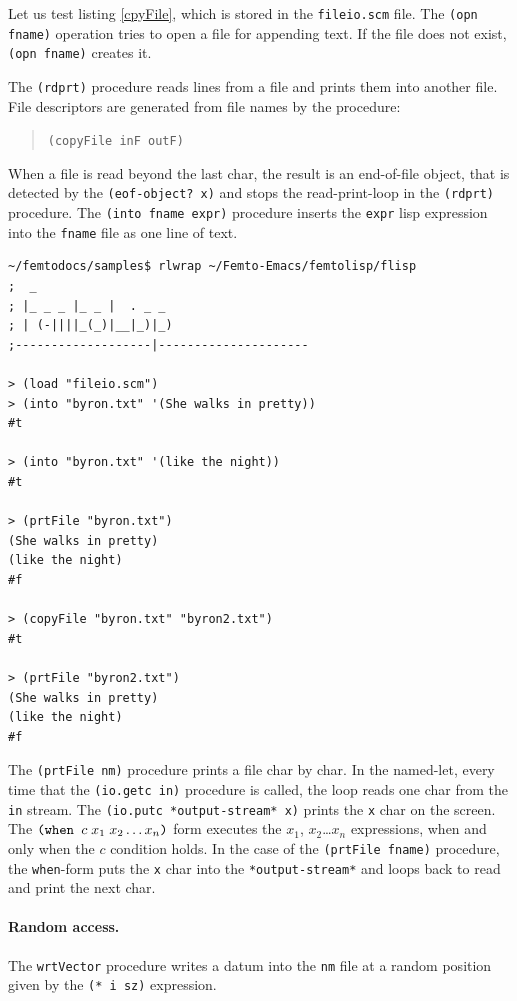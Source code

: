 \documentclass[a4paper,12pt]{book}
\begin{document}
Let us test  listing \ref{cpyFile},
which is stored in the \verb|fileio.scm| file.
The \verb|(opn fname)| operation tries to
open a file for appending text. If the file
does not exist, \verb|(opn fname)| creates it.

The \verb|(rdprt)| procedure reads 
lines from a file and prints them into another file.
File descriptors are generated from file
names by the procedure: 
\begin{quote}
\verb|(copyFile inF outF)|
\end{quote}
When a file is read beyond
the last char, the result is an
end-of-file object, that is detected
by the \verb|(eof-object? x)| and
stops the read-print-loop in the
\verb|(rdprt)| procedure.
The \verb|(into fname expr)| procedure
inserts the \verb|expr| lisp expression
into the \verb|fname| file as 
one line of text.

\begin{verbatim}
~/femtodocs/samples$ rlwrap ~/Femto-Emacs/femtolisp/flisp
;  _
; |_ _ _ |_ _ |  . _ _
; | (-||||_(_)|__|_)|_)
;-------------------|---------------------

> (load "fileio.scm")
> (into "byron.txt" '(She walks in pretty))
#t

> (into "byron.txt" '(like the night))
#t

> (prtFile "byron.txt")
(She walks in pretty)
(like the night)
#f

> (copyFile "byron.txt" "byron2.txt")
#t

> (prtFile "byron2.txt")
(She walks in pretty)
(like the night)
#f
\end{verbatim}
The \verb|(prtFile nm)| procedure prints
a file char by char. In the named-let,
every time that the \verb|(io.getc in)|
procedure is called, the loop reads 
one char from the \verb|in|
stream. The \verb|(io.putc *output-stream* x)|
prints the \verb|x| char on the screen.
The  $\verb|(when | c\; x_1\;x_2\ldots x_n\verb|)|$ form
executes the $x_1$, $x_2$\ldots $x_n$ 
expressions,
when and only when the $c$ condition holds.
In the case of the \verb|(prtFile fname)|
procedure, the \verb|when|-form puts
the \verb|x| char into the \verb|*output-stream*|
and loops back to read and print the next char.

\paragraph{Random access.}
The \verb|wrtVector| procedure writes a datum
into the \verb|nm| file at a
random position given by the \verb|(* i sz)|
expression.
\end{document}
